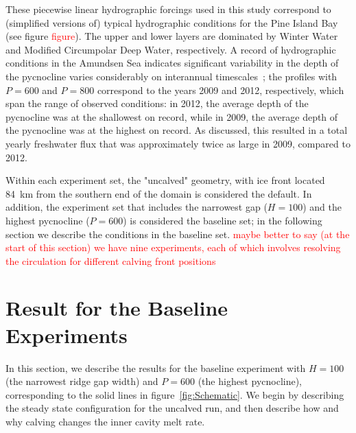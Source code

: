 \documentclass[draft]{agujournal2019}
\newcommand{\red}[1]{\textcolor{red}{#1}}
\begin{document}
These piecewise linear hydrographic forcings used in this study correspond to (simplified versions of) typical hydrographic conditions for the Pine Island Bay~\cite{Jacobs1996GRL, Dutrieux2014Science, Jenkins2018NatureGeo} (see figure \red{figure}). The upper and lower layers are dominated by Winter Water and Modified Circumpolar Deep Water, respectively. A record of hydrographic conditions in the Amundsen Sea indicates significant variability in the depth of the pycnocline varies considerably on interannual timescales~\cite{Dutrieux2014Science}; the profiles with $P = 600$ and $P = 800$ correspond to the years 2009 and 2012, respectively, which span the range of observed conditions: in 2012, the average depth of the pycnocline was at the shallowest on record, while in 2009, the average depth of the pycnocline was at the highest on record. As discussed, this resulted in a total yearly freshwater flux that was approximately twice as large in 2009, compared to 2012.

Within each experiment set, the "uncalved" geometry, with ice front located 84~km from the southern end of the domain is considered the default. In addition, the experiment set that includes the narrowest gap ($H = 100$) and the highest pycnocline ($P = 600$) is considered the baseline set; in the following section we describe the conditions in the baseline set. \red{maybe better to say (at the start of this section) we have nine experiments, each of which involves resolving the circulation for different calving front positions}

\section{Result for the Baseline Experiments}\label{S:Baseline}
In this section, we describe the results for the baseline experiment with $H = 100$ (the narrowest ridge gap width) and $P = 600$ (the highest pycnocline), corresponding to the solid lines in figure~\ref{fig:Schematic}. We begin by describing the steady state configuration for the uncalved run, and then describe how and why calving changes the inner cavity melt rate.
\end{document}
